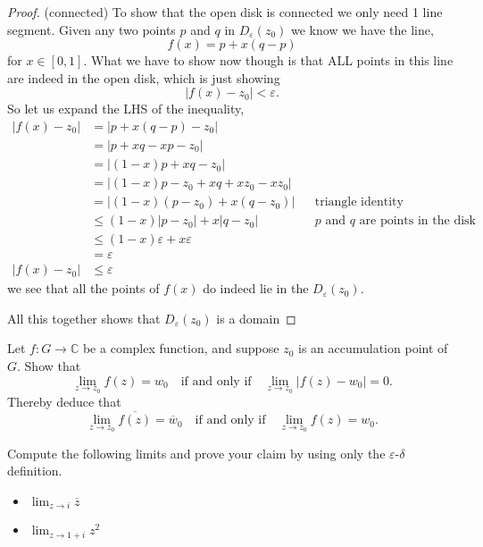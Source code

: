 \documentclass[11pt]{article}
\newenvironment{problem}[2][Problem\!]{\begin{trivlist}
\item[\hskip \labelsep {\bfseries #1}\hskip \labelsep {\bfseries #2}]}{\end{trivlist}}
\newcommand{\cc}{\mathbb C}   %
\newcommand{\abs}[1]{\left\lvert#1\right\rvert} %
\renewcommand{\epsilon}{\varepsilon}
\renewcommand{\leq}{\leqslant}
\begin{document}
\begin{problem}{2.3}
\begin{itemize}[itemsep=3em]
\begin{example}
\begin{proof}
        (connected) To show that the open disk is connected we only need 1 line segment. Given any two points $p$ and $q$ in $D_\epsilon(z_0)$ we know we have the line,
        \[f(x) = p +  x(q - p )\]
        for $x \in [0,1]$. What we have to show now though is that ALL points in this line are indeed in the open disk, which is just showing \[\abs{f(x) - z_0} < \epsilon.\]
        So let us expand the LHS of the inequality,
        \begin{align*}
            \abs{f(x) - z_0} &= \abs{p + x(q - p) - z_0} \\
            &= \abs{p + xq -xp -z_0} \\
            &= \abs{(1- x)p + xq -z_0} \\
            &= \abs{(1-x)p - z_0 + xq + xz_0 - xz_0 } \\
            &= \abs{(1-x)(p-z_0) + x(q - z_0)} && \text{triangle identity}\\
            &\leq (1-x)\abs{p - z_0} + x\abs{q - z_0} && \text{$p$ and $q$ are points in the disk} \\
            &\leq (1-x)\epsilon + x \epsilon \\
            &= \epsilon \\
            \abs{f(x) - z_0} &\leq \epsilon
        \end{align*}
        we see that all the points of $f(x)$ do indeed lie in the $D_\epsilon(z_0)$.

        All this together shows that $D_\epsilon(z_0)$ is a domain

    \end{proof}
\end{example}

\end{itemize}
\end{problem}

\newpage  %

\begin{problem}{2.4}
Let $f : G \to \cc$ be a complex function, and suppose $z_0$ is an accumulation point of $G$. Show that 
\[\lim_{z \to z_0} f(z) = w_0 \quad \text{if and only if} \quad \lim_{z\to z_0}\abs{f(z) - w_0} = 0.\]
Thereby deduce that 
\[\lim_{z \to z_0} \overline{f(z)} = \overline{w}_0 \quad \text{if and only if} \quad \lim_{z \to z_0} f(z) = w_0.\]
\end{problem}


\newpage  %

\begin{problem}{2.5}
Compute the following limits and prove your claim by using only the $\epsilon$-$\delta$ definition.
\begin{itemize}[itemsep=3em]
\item[(a)] $\displaystyle \lim_{z \to i}\overline{z}$


\item[(b)] $\displaystyle \lim_{z \to 1+i}z^2$


\end{itemize}
\end{problem}
\end{document}
